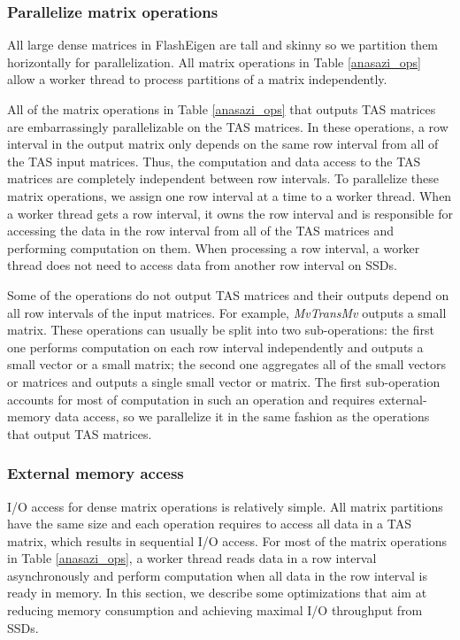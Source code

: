 \subsubsection{Parallelize matrix operations} \label{sec:par}
All large dense matrices in FlashEigen are tall and skinny so we partition
them horizontally for parallelization. All matrix operations in Table
\ref{anasazi_ops} allow a worker thread to process partitions of a matrix
independently.

All of the matrix operations in Table \ref{anasazi_ops} that outputs TAS
matrices are embarrassingly parallelizable on the TAS matrices. In these
operations, a row interval in the output matrix only depends on the same row
interval from all of the TAS input matrices. Thus, the computation and data
access to the TAS matrices are completely independent between row intervals.
To parallelize these matrix operations, we assign one row interval at a time to
a worker thread. When a worker thread gets a row interval, it owns the row
interval and is responsible for accessing the data in the row interval from
all of the TAS matrices and performing computation on them. When processing
a row interval, a worker thread does not need to access data from another row
interval on SSDs.

Some of the operations do not output TAS matrices and their outputs depend on
all row intervals of the input matrices. For example, \textit{MvTransMv}
outputs a small matrix. These operations can usually be split into two
sub-operations: the first one performs computation on each row interval
independently and outputs a small vector or a small matrix; the second one
aggregates all of the small vectors or matrices and outputs a single small
vector or matrix. The first sub-operation accounts for most of computation in
such an operation and requires external-memory data access, so we parallelize
it in the same fashion as the operations that output TAS matrices.


\subsubsection{External memory access} \label{sec:em}
I/O access for dense matrix operations is relatively simple. All matrix partitions
have the same size and each operation requires to access all data in a TAS
matrix, which results in sequential I/O access. For most of the matrix operations
in Table \ref{anasazi_ops}, a worker thread reads data in a row interval
asynchronously and perform computation when all data in the row interval is
ready in memory. In this section, we describe some optimizations that aim at
reducing memory consumption and achieving maximal I/O throughput from SSDs.

